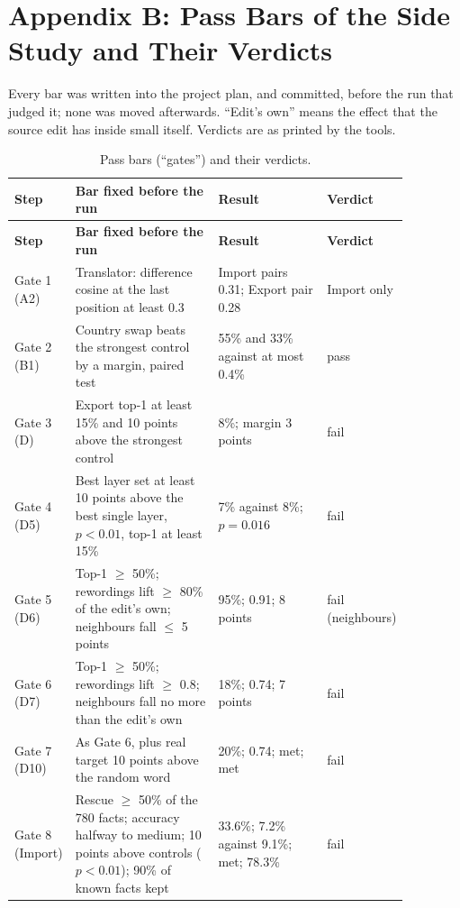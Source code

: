 \section*{Appendix B: Pass Bars of the Side Study and Their Verdicts}

Every bar was written into the project plan, and committed, before the run that judged it; none was moved afterwards. ``Edit's own'' means the effect that the source edit has inside small itself. Verdicts are as printed by the tools.

\setcounter{table}{0}
{\small
\begin{longtable}{|p{0.07\linewidth}|p{0.40\linewidth}|p{0.30\linewidth}|p{0.10\linewidth}|}
\caption{Pass bars (``gates'') and their verdicts.}\label{tab:gates}\\ \hline
\textbf{Step} & \textbf{Bar fixed before the run} & \textbf{Result} & \textbf{Verdict}\\ \hline \endfirsthead
\hline \textbf{Step} & \textbf{Bar fixed before the run} & \textbf{Result} & \textbf{Verdict}\\ \hline \endhead
Gate 1 (A2) & Translator: difference cosine at the last position at least 0.3 & Import pairs 0.31; Export pair 0.28 & Import only\\ \hline
Gate 2 (B1) & Country swap beats the strongest control by a margin, paired test & 55\% and 33\% against at most 0.4\% & pass\\ \hline
Gate 3 (D) & Export top-1 at least 15\% and 10 points above the strongest control & 8\%; margin 3 points & fail\\ \hline
Gate 4 (D5) & Best layer set at least 10 points above the best single layer, $p<0.01$, top-1 at least 15\% & 7\% against 8\%; $p=0.016$ & fail\\ \hline
Gate 5 (D6) & Top-1 $\geq$ 50\%; rewordings lift $\geq$ 80\% of the edit's own; neighbours fall $\leq$ 5 points & 95\%; 0.91; 8 points & fail (neighbours)\\ \hline
Gate 6 (D7) & Top-1 $\geq$ 50\%; rewordings lift $\geq$ 0.8; neighbours fall no more than the edit's own & 18\%; 0.74; 7 points & fail\\ \hline
Gate 7 (D10) & As Gate 6, plus real target 10 points above the random word & 20\%; 0.74; met; met & fail\\ \hline
Gate 8 (Import) & Rescue $\geq$ 50\% of the 780 facts; accuracy halfway to medium; 10 points above controls ($p<0.01$); 90\% of known facts kept & 33.6\%; 7.2\% against 9.1\%; met; 78.3\% & fail\\ \hline

\end{longtable}}
